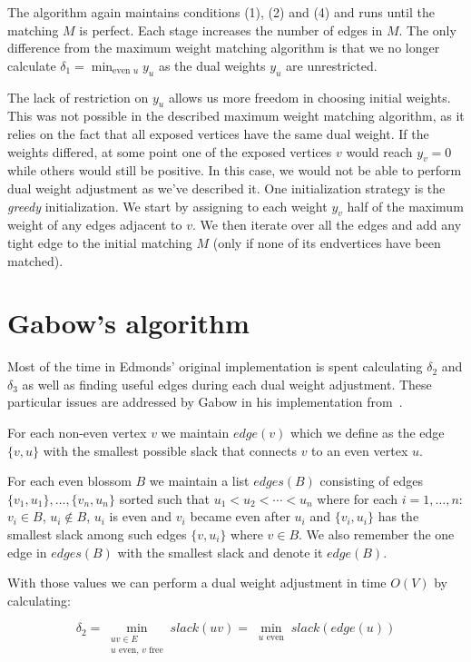 The algorithm again maintains conditions (1), (2) and (4) and runs until the matching $M$ is perfect. Each stage increases the number of edges in $M$. The only difference from the maximum weight matching algorithm is that we no longer calculate $\delta_1 = \min_{\text{even } u} y_u$ as the dual weights $y_u$ are unrestricted.

The lack of restriction on $y_u$ allows us more freedom in choosing initial weights. This was not possible in the described maximum weight matching algorithm, as it relies on the fact that all exposed vertices have the same dual weight. If the weights differed, at some point one of the exposed vertices $v$ would reach $y_v = 0$ while others would still be positive. In this case, we would not be able to perform dual weight adjustment as we've described it. One initialization strategy is the \emph{greedy} initialization. We start by assigning to each weight $y_v$ half of the maximum weight of any edges adjacent to $v$. We then iterate over all the edges and add any tight edge to the initial matching $M$ (only if none of its endvertices have been matched).

\section{Gabow's algorithm}

Most of the time in Edmonds' original implementation is spent calculating $\delta_2$ and $\delta_3$ as well as finding useful edges during each dual weight adjustment. These particular issues are addressed by Gabow in his implementation from~\cite{gabow1974implementation}.

For each non-even vertex $v$ we maintain $edge(v)$ which we define as the edge $\{v, u\}$ with the smallest possible slack that connects $v$ to an even vertex $u$.

For each even blossom $B$ we maintain a list $edges(B)$ consisting of edges $\{v_1, u_1\}, \dots, \{v_n, u_n\}$ sorted such that $u_1 < u_2 < \cdots < u_n$ where for each $i = 1, \dots, n$: $v_i \in B$, $u_i \notin B$, $u_i$ is even and $v_i$ became even after $u_i$ and $\{v_i, u_i\}$ has the smallest slack among such edges $\{v, u_i\}$ where $v \in B$. We also remember the one edge in $edges(B)$ with the smallest slack and denote it $edge(B)$.

With those values we can perform a dual weight adjustment in time $O(V)$ by calculating:

\[\delta_2=\min_{\substack{uv\in E \\ \text{$u$ even, $v$ free}}} slack(uv) = \min_{\substack{u \text{ even}}} slack(edge(u))\] 

